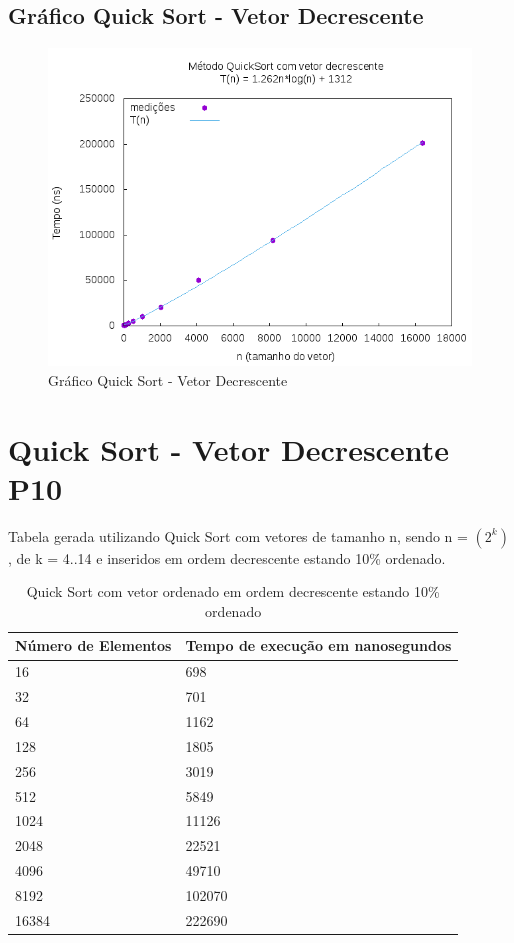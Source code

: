 \documentclass[12pt,a4paper,twoside]{report}
\begin{document}
\subsection{Gráfico Quick Sort - Vetor Decrescente}
\begin{figure}[H]
    \centering
    \includegraphics[width=0.7\linewidth]{graficos/QuickSort/vIntDecrescente/vIntDecrescente.png}
  \caption{Gráfico Quick Sort - Vetor Decrescente}
\end{figure}

\section{Quick Sort - Vetor Decrescente P10}
Tabela gerada utilizando Quick Sort com vetores de tamanho n, sendo n = $(2^k)$, de k = 4..14 e inseridos em ordem decrescente estando 10\% ordenado.
\begin{table}[H]
\centering
\caption{Quick Sort com vetor ordenado em ordem decrescente estando 10\% ordenado}
\label{my-label}
\begin{tabular}{|l|l|}
\hline
\multicolumn{1}{|c|}{\textbf{Número de Elementos}} & \multicolumn{1}{c|}{\textbf{Tempo de execução em nanosegundos}} \\ \hline
16 & 698 \\ \hline
32 & 701 \\ \hline
64 & 1162 \\ \hline
128 & 1805 \\ \hline
256 & 3019 \\ \hline
512 & 5849 \\ \hline
1024 & 11126 \\ \hline
2048 & 22521 \\ \hline
4096 & 49710 \\ \hline
8192 & 102070 \\ \hline
16384 & 222690 \\ \hline
\end{tabular}
\end{table}
\end{document}
